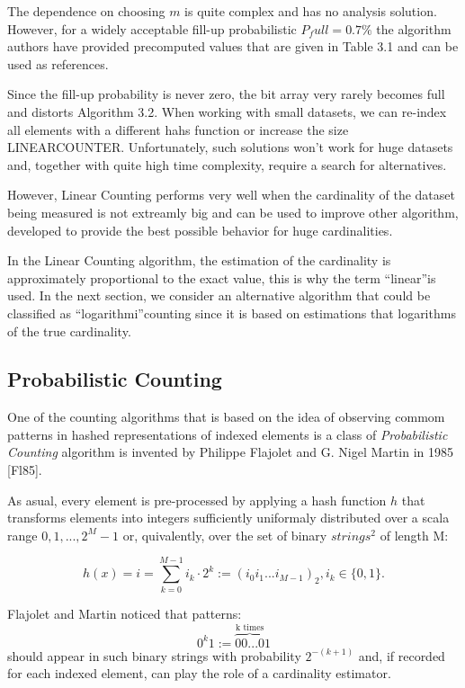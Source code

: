 \documentclass[a4paper,13pt]{article}
\theoremstyle{mytheor}
\begin{document}
The dependence on choosing $m$ is quite complex and has no analysis
solution. However, for a widely acceptable fill-up probabilistic $P_full = 0.7\%$
the algorithm authors have provided precomputed values that are given in Table 3.1
and can be used as references.

Since the fill-up probability is never zero, the bit array very rarely
becomes full and distorts Algorithm 3.2. When working with small
datasets, we can re-index all elements with a different hahs function or 
increase the size LINEARCOUNTER. Unfortunately, such solutions
won't work for huge datasets and, together with quite high time
complexity, require a search for alternatives.

However, Linear Counting performs very well when the cardinality
of the dataset being measured is not extreamly big and can be used to
improve other algorithm, developed to provide the best possible behavior
for huge cardinalities.

In the Linear Counting algorithm, the estimation of the cardinality
is approximately proportional to the exact value, this is why the term
\textquotedblleft linear\textquotedblright\space is used. In the next section, we consider an alternative algorithm
that could be classified as \textquotedblleft logarithmi\textquotedblright\space counting since it is based on
estimations that logarithms of the true cardinality.
\subsection{Probabilistic Counting}
One of the counting algorithms that is based on the idea of observing
commom patterns in hashed representations of indexed elements is a class
of \textit{Probabilistic Counting} algorithm is invented by Philippe Flajolet and
G. Nigel Martin in 1985 [Fl85].

As asual, every element is pre-processed by applying a hash function $h$
that transforms elements into integers sufficiently uniformaly distributed
over a scala range ${0, 1,...,2^M - 1}$ or, quivalently, over the set of
binary $strings^2$ of length M:

\[h(x) = i = \sum_{k=0}^{M-1} i_k\cdot 2^k := (i_0i_1...i_{M-1})_2, i_k \in \{0,1\}.\]

Flajolet and Martin noticed that patterns:
\[0^k1 := \overbrace{00...0}^{\text{k times}}1\]
should appear in such binary strings with probability $2^{-(k+1)}$ and, if
recorded for each indexed element, can play the role of a cardinality
estimator.
\end{document}
